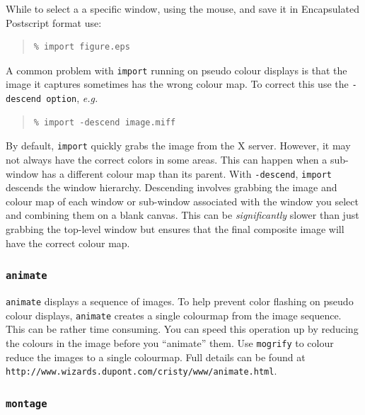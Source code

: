 \documentclass[twoside,11pt]{article}
\newcommand{\htmladdnormallink}[2]{#1}
\newcommand{\htmlref}[2]{#1}
\begin{document}
While to select a a specific window, using the mouse, and save it in Encapsulated Postscript format use:

\small
\begin{quote}
\begin{verbatim} 
% import figure.eps 
\end{verbatim}
\end{quote}
\normalsize

A common problem with {\tt import} running on \htmlref{pseudo colour }{sc15_pseudo} displays is that the image it captures sometimes has the wrong colour map. To correct this use the {\tt -descend option}, {\em e.g.\ } 

\small
\begin{quote}
\begin{verbatim} 
% import -descend image.miff
\end{verbatim}
\end{quote}
\normalsize

By default, {\tt import} quickly grabs the image from the X server. However, it may not always have the correct colors in some areas. This can happen when a sub-window has a different colour map than its parent. With {\tt -descend}, {\tt import} descends the window hierarchy. Descending involves grabbing the image and colour map of each window or sub-window associated with the window you select and combining them on a blank canvas. This can be {\em significantly} slower than just grabbing the top-level window but ensures that the final composite image will have the correct colour map.

\subsubsection{{\tt animate}}

{\tt animate} displays a sequence of images. To help prevent color flashing on \htmlref{pseudo colour}{sc15_pseudo} displays, {\tt animate} creates a single colourmap from the image sequence. This can be rather time consuming. You can speed this operation up by reducing the colours in the image before you ``animate'' them. Use {\tt mogrify} to colour reduce the images to a single colourmap. Full details can be found at \htmladdnormallink{{\tt http://www.wizards.dupont.com/cristy/www/animate.html}}{http://www.wizards.dupont.com/cristy/www/animate.html}.
    
\subsubsection{{\tt montage}}
\end{document}
